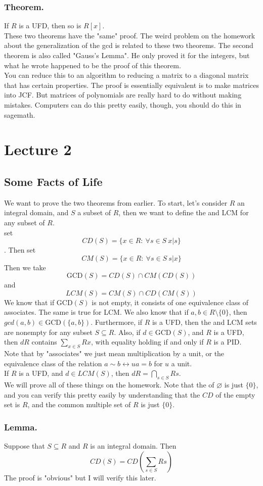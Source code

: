 \documentclass{article}
\newcommand{\vs}{\bigskip\\\text{}}
\begin{document}
\subsubsection{Theorem.} If $R$ is a UFD, then so is $R[x]$. \vs
These two theorems have the "same" proof. The weird problem on the homework
about the generalization of the gcd is related to these two theorems. The second
theorem is also called "Gauss's Lemma". He only proved it for the integers, but
what he wrote happened to be the proof of this theorem.\vs
You can reduce this to an algorithm to reducing a matrix to a diagonal matrix
that has certain properties. The proof is essentially equivalent is to make
matrices into JCF. But matrices of polynomials are really hard to do without
making mistakes. Computers can do this pretty easily, though, you should do this
in sagemath.
\section{Lecture 2}
\subsection{Some Facts of Life}
We want to prove the two theorems from earlier. To start, let's consider $R$ an integral domain, and
$S$ a subset of $R$, then we want to define the  and LCM for any subset of
$R$. \vs
set \[CD(S) =\{ x \in R: \: \forall s\in S \: x | s\}\]. Then set 
\[
CM(S) =\{ x\in R: \: \forall s\in S \: s | x\}
\]
Then we take 
\[\text{GCD}(S) = CD(S) \cap CM(CD(S))\]
and \[ LCM(S) = CM(S) \cap CD(CM(S))\]
We know that if $\text{GCD}(S)$ is not empty, it consists of one equivalence class of
associates. The same is true for LCM. We also know that if $a,b \in R\setminus
\{ 0\}$, then  $gcd(a,b) \in \text{GCD}(\{a,b\} )$. Furthermore, if $R$ is a UFD, then
the  and LCM sets are nonempty for any subset $S \subseteq R$. Also, if $d
\in \text{GCD}(S)$, and $R$ is a UFD, then $dR$ contains $\sum_{x\in S}Rx$, with
equality holding if and only if $R$ is a PID.\vs
Note that by "associates" we just mean multiplication by a unit, or the
equivalence class of the relation $a \sim b \leftrightarrow ua = b$ for $u$ a
unit. \vs
If  $R$ is a UFD, and $d\in LCM(S)$, then $dR = \bigcap_{s\in S}Rs$.\vs
We will prove all of these things on the homework. Note that the  of
$\varnothing$ is just $\{0\}$, and you can verify this pretty easily by
understanding that the $CD $ of the empty set is $R$, and the common multiple
set of $R$ is just $\{0\}$. 
\subsubsection{Lemma.} Suppose that $S \subseteq R$ and $R$ is an integral
domain. Then 
\[
CD(S) = CD\left(\sum_{s\in S}Rs\right)
\]
The proof is "obvious" but I will verify this later.
\end{document}
